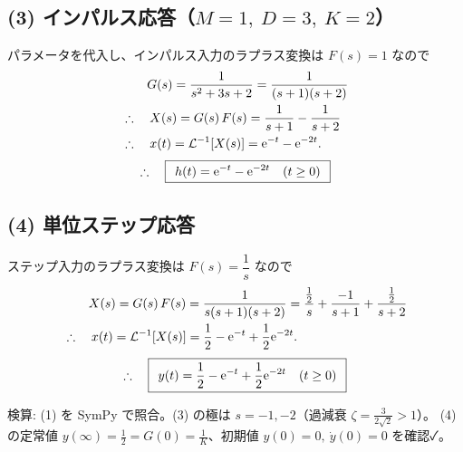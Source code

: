 \documentclass[11pt,a4paper]{article}
\begin{document}
\subsection*{(3) インパルス応答（$M=1,\ D=3,\ K=2$）}
パラメータを代入し、インパルス入力のラプラス変換は $F(s)=1$ なので
\begin{align*}
  &\qquad G(s)=\frac{1}{s^2+3s+2}=\frac{1}{(s+1)(s+2)}\\
  &\therefore\quad X(s)=G(s)\,F(s)=\frac{1}{s+1}-\frac{1}{s+2}\\
  &\therefore\quad x(t)=\mathcal{L}^{-1}\!\left[X(s)\right]=\mathrm{e}^{-t}-\mathrm{e}^{-2t}.
\end{align*}
\[
  \therefore\quad \boxed{\,\;h(t)=\mathrm{e}^{-t}-\mathrm{e}^{-2t}\quad(t\ge0)\;\,}
\]

\subsection*{(4) 単位ステップ応答}
ステップ入力のラプラス変換は $F(s)=\dfrac1s$ なので
\begin{align*}
  &\qquad X(s)=G(s)\,F(s)=\frac{1}{s(s+1)(s+2)}
   =\frac{\frac12}{s}+\frac{-1}{s+1}+\frac{\frac12}{s+2}\\
  &\therefore\quad x(t)=\mathcal{L}^{-1}\!\left[X(s)\right]
   =\frac12-\mathrm{e}^{-t}+\frac12\mathrm{e}^{-2t}.
\end{align*}
\[
  \therefore\quad \boxed{\,\;y(t)=\dfrac12-\mathrm{e}^{-t}+\dfrac12\mathrm{e}^{-2t}\quad(t\ge0)\;\,}
\]

\bigskip
\noindent 検算: (1) を SymPy で照合。(3) の極は $s=-1,-2$（過減衰 $\zeta=\tfrac{3}{2\sqrt2}>1$）。
(4) の定常値 $y(\infty)=\tfrac12=G(0)=\tfrac1K$、初期値 $y(0)=0,\ \dot y(0)=0$ を確認✓。
\end{document}
